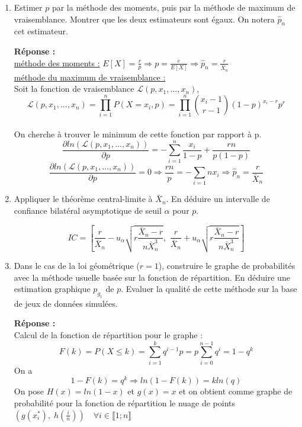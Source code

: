 \documentclass[12pt]{article}
\newcommand{\dsp}{\displaystyle}
\begin{document}
\begin{enumerate}

\renewcommand{\labelenumi}{\arabic{section}.\arabic{enumi}.}

\item Estimer $p$ par la méthode des moments, puis par la méthode de maximum de vraisemblance. Montrer que les deux estimateurs sont égaux. On notera $\hat{p}_n$ cet estimateur.

\textbf{Réponse :\\}
\underline{méthode des moments :} $E[X] = \dsp \frac{r}{p} \Rightarrow p = \frac{e}{E[X]} \Rightarrow \hat{p}_n = \frac{r}{\bar{X}_n} $ \\
\underline{méthode du maximum de vraisemblance :} \\
Soit  la fonction de vraisemblance $\mathcal{L}(p, x_{1}, ..., x_{n})$,\\$$\mathcal{L}(p, x_{1}, ... , x_{n}) = \prod_{i=1}^{n}P(X=x_{i}, p)  = \prod_{i=1}^n \binom{x_i-1}{r-1}(1-p)^{x_i-r}p^r$$ \\
On cherche à trouver le minimum de cette fonction par rapport à p. \\
\[\frac{\partial{ln(\mathcal{L}(p, x_{1}, ... , x_{n}))}}{\partial{p}} = -\sum_{i=1}^{n} \frac{x_{i}}{1-p} + \frac{rn}{p(1-p)}\]
\[\frac{\partial{ln(\mathcal{L}(p, x_{1}, ... , x_{n}))}}{\partial{p}} = 0 \Rightarrow \frac{rn}{p} = -\sum_{i=1}{n} x_{i} \Rightarrow \hat{p}_n = \frac{r}{\bar{X}_n}\]
\vspace{3mm}

\item Appliquer le théorème central-limite à $\bar{X}_n$. En déduire un intervalle de confiance bilatéral asymptotique de seuil $\alpha$ pour $p$.

$$ IC = \left[ \frac{r}{\bar{X}_n} - u_{\alpha} \sqrt{r\frac{\bar{X}_n - r}{n\bar{X}_n^3}} ,\,\, \frac{r}{\bar{X}_n} + u_{\alpha} \sqrt{r\frac{\bar{X}_n - r}{n\bar{X}_n^3}}  \right] $$

\vspace{3mm}

\item Dans le cas de la loi géométrique ($r=1$), construire le graphe de probabilités avec la méthode usuelle basée sur la fonction de répartition. En déduire une estimation graphique $p_{g_1}$ de $p$. Evaluer la qualité de cette méthode sur la base de jeux de données simulées.


\textbf{Réponse : \\}
Calcul de la fonction de répartition pour le graphe : $$ F(k) = P(X \leq k) = \sum_{i=1}^{k} q^{i-1}p = p\sum_{i=0}^{n-1} q^{i} = 1 - q^{k}$$
On a $$ 1 - F(k) = q^{k} \Rightarrow ln(1-F(k)) = k ln(q)$$
On pose $H(x) = ln(1-x)$ et $g(x) = x$ et on obtient comme graphe de probabilité pour la fonction de répartition le nuage de points $ (g(x_i^{*}), \; h(\frac{i}{n})) \quad \forall i \in \llbracket 1; n \rrbracket $


\end{enumerate}
\end{document}
